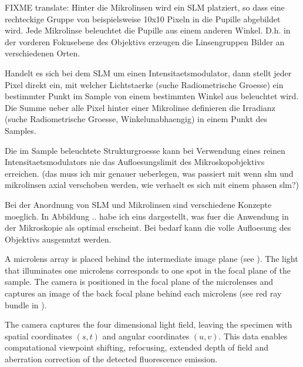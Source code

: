 FIXME translate: Hinter die Mikrolinsen wird ein SLM platziert, so
dass eine rechteckige Gruppe von beispielsweise 10x10 Pixeln in die
Pupille abgebildet wird. Jede Mikrolinse beleuchtet die Pupille aus
einem anderen Winkel. D.h. in der vorderen Fokusebene des Objektivs
erzeugen die Linsengruppen Bilder an verschiedenen Orten.

Handelt es sich bei dem SLM um einen Intensitaetsmodulator, dann
stellt jeder Pixel direkt ein, mit welcher Lichtstaerke (suche
Radiometrische Groesse) ein bestimmter Punkt im Sample von einem
bestimmten Winkel aus beleuchtet wird.  Die Summe ueber alle Pixel
hinter einer Mikrolinse definieren die Irradianz (suche Radiometrische
Groesse, Winkelunabhaengig) in einem Punkt des Samples.

Die im Sample beleuchtete Strukturgroesse kann bei Verwendung eines
reinen Intensitaetsmodulators nie das Aufloesungslimit des
Mikroskopobjektivs erreichen. (das muss ich mir genauer ueberlegen,
was passiert mit wenn slm und mikrolinsen axial verschoben werden, wie
verhaelt es sich mit einem phasen slm?)

Bei der Anordnung von SLM und Mikrolinsen sind verschiedene Konzepte
moeglich. In Abbildung .. habe ich eins dargestellt, was fuer die
Anwendung in der Mikroskopie als optimal erscheint. Bei bedarf kann
die volle Aufloesung des Objektivs ausgenutzt werden.

A microlens array is placed behind the intermediate image plane (see
). The light that illuminates one
microlens corresponds to one spot in the focal plane of the
sample. The camera is positioned in the focal plane of the microlenses
and captures an image of the back focal plane behind each microlens
(see red ray bundle in ).

The camera captures the four dimensional light field, leaving the
specimen with spatial coordinates $(s,t)$ and angular coordinates
$(u,v)$. This data enables computational viewpoint shifting,
refocusing, extended depth of field and aberration correction of the
detected fluorescence emission.


